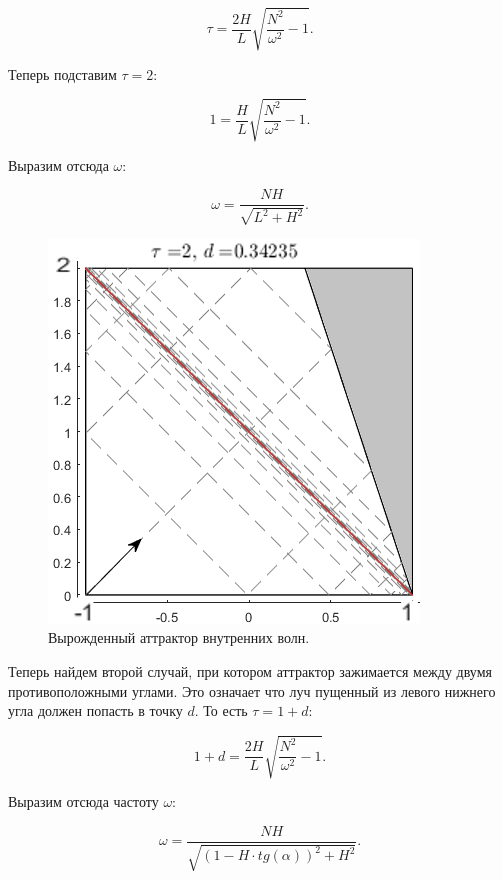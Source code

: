 \begin{equation}
    \tau=\frac{2H}{L} \sqrt{\frac{N^2}{\omega^2}-1}.
\end{equation}

Теперь подставим $\tau=2$:

\begin{equation}
    1=\frac{H}{L} \sqrt{\frac{N^2}{\omega^2}-1}.
\end{equation}

Выразим отсюда $\omega$:

\begin{equation}
    \omega=\frac{NH}{\sqrt{L^2+H^2}}.
\end{equation}

\begin{figure}
    \centering
    \includegraphics[scale=0.8]{Figs/CritAttrFreq.png}
    \caption{Вырожденный аттрактор внутренних волн.}
    \label{fig:trivAttr}
\end{figure}

Теперь найдем второй случай, при котором аттрактор зажимается между двумя противоположными углами. Это означает что луч пущенный из левого нижнего угла должен попасть в точку $d$. То есть $\tau = 1+d$:

\begin{equation}
    1+d=\frac{2H}{L} \sqrt{\frac{N^2}{\omega^2}-1}.
\end{equation}

Выразим отсюда частоту $\omega$:

\begin{equation}
    \omega = \frac{NH}{\sqrt{\left( 1-H\cdot tg(\alpha) \right)^2+H^2}}.
\end{equation}

